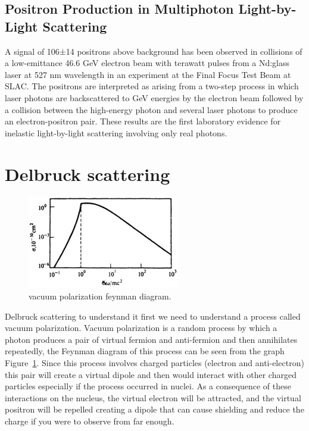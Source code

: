 \documentclass{article}
\begin{document}
\subsection{Positron Production in Multiphoton Light-by-Light Scattering}%
\label{subsec:positron}

\label{subsec:light-light-low-energy}
A signal of 106±14 positrons above background has been observed in collisions of a low-emittance 46.6 GeV electron beam with terawatt pulses from a Nd:glass laser at 527 nm wavelength in an experiment at the Final Focus Test Beam at SLAC. The positrons are interpreted as arising from a two-step process in which laser photons are backscattered to GeV energies by the electron beam followed by a collision between the high-energy photon and several laser photons to produce an electron-positron pair. These results are the first laboratory evidence for inelastic light-by-light scattering involving only real photons.\cite{physrevlett}



\section{Delbruck scattering}

\begin{figure}[!th]
	\centering
	\includegraphics[width=0.5\linewidth]{figures/photon-photon-scattering.jpg}
	\caption{vacuum polarization feynman diagram.}
	\label{fig:vacuum-polarization}
\end{figure}

Delbruck scattering to understand it first we need to understand a process called vacuum polarization.
Vacuum polarization is a random process by which a photon produces a pair of virtual fermion and anti-fermion and then annihilates repeatedly, the Feynman diagram of this process can be seen from the graph Figure~\ref{fig:vacuum-polarization}.
Since this process involves charged particles (electron and anti-electron) this pair will create a virtual dipole and then would interact with other charged particles especially if the process occurred in nuclei. As a consequence of these interactions on the nucleus, the virtual electron will be attracted, and the virtual positron will be repelled creating a dipole that can cause shielding and reduce the charge if you were to observe from far enough.
\end{document}
